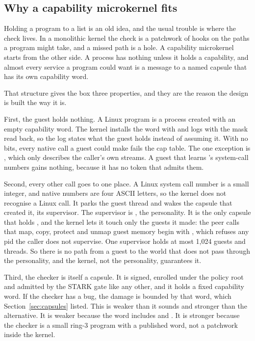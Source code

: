 \subsection{Why a capability microkernel fits}

Holding a program to a list is an old idea, and the usual trouble is where the check lives. In a monolithic kernel the check is a patchwork of hooks on the paths a program might take, and a missed path is a hole. A capability microkernel starts from the other side. A process has nothing unless it holds a capability, and almost every service a program could want is a message to a named capsule that has its own capability word.

That structure gives the box three properties, and they are the reason the design is built the way it is.

First, the guest holds nothing. A Linux program is a process created with an empty capability word. The kernel installs the word with  and logs  with the mask read back, so the log states what the guest holds instead of assuming it. With no bits, every native call a guest could make fails the cap table. The one exception is , which only describes the caller's own streams. A guest that learns \nonos{}'s system-call numbers gains nothing, because it has no token that admits them.

Second, every other call goes to one place. A Linux system call number is a small integer, and \nonos{} native numbers are four ASCII letters, so the kernel does not recognise a Linux call. It parks the guest thread and wakes the capsule that created it, its supervisor. The supervisor is , the personality. It is the only capsule that holds , and the kernel lets it touch only the guests it made: the peer calls that map, copy, protect and unmap guest memory begin with , which refuses any pid the caller does not supervise. One supervisor holds at most 1,024 guests and threads. So there is no path from a guest to the world that does not pass through the personality, and the kernel, not the personality, guarantees it.

Third, the checker is itself a capsule. It is signed, enrolled under the policy root and admitted by the STARK gate like any other, and it holds a fixed capability word. If the checker has a bug, the damage is bounded by that word, which Section~\ref{sec:capsules} listed. This is weaker than it sounds and stronger than the alternative. It is weaker because the word includes  and . It is stronger because the checker is a small ring-3 program with a published word, not a patchwork inside the kernel.

